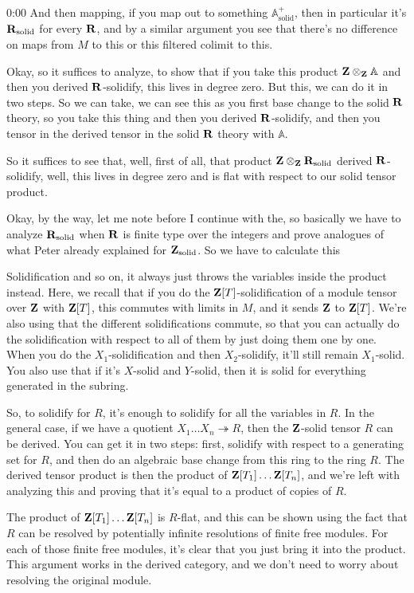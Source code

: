 \begin{unfinished}{0:00}
And then mapping, if you map out to something $\mathbb{A}^+_{\mathrm{solid}}$, then in particular it's $\mathbf R_{\mathrm{solid}}$ for every $\mathbf R$, and by a similar argument you see that there's no difference on maps from $M$ to this or this filtered colimit to this. 

Okay, so it suffices to analyze, to show that if you take this product $\mathbf Z \otimes_\mathbf Z \mathbb{A}$ and then you derived $\mathbf R$-solidify, this lives in degree zero. But this, we can do it in two steps. So we can take, we can see this as you first base change to the solid $\mathbf R$ theory, so you take this thing and then you derived $\mathbf R$-solidify, and then you tensor in the derived tensor in the solid $\mathbf R$ theory with $\mathbb{A}$.

So it suffices to see that, well, first of all, that product $\mathbf Z \otimes_\mathbf Z \mathbf R_{\mathrm{solid}}$ derived $\mathbf R$-solidify, well, this lives in degree zero and is flat with respect to our solid tensor product.

Okay, by the way, let me note before I continue with the, so basically we have to analyze $\mathbf R_{\mathrm{solid}}$ when $\mathbf R$ is finite type over the integers and prove analogues of what Peter already explained for $\mathbf Z_{\mathrm{solid}}$. So we have to calculate this

Solidification and so on, it always just throws the variables inside the product instead. Here, we recall that if you do the $\mathbf Z[T]$-solidification of a module tensor over $\mathbf Z$ with $\mathbf Z[T]$, this commutes with limits in $M$, and it sends $\mathbf Z$ to $\mathbf Z[T]$. We're also using that the different solidifications commute, so that you can actually do the solidification with respect to all of them by just doing them one by one. When you do the $X_1$-solidification and then $X_2$-solidify, it'll still remain $X_1$-solid. You also use that if it's $X$-solid and $Y$-solid, then it is solid for everything generated in the subring.

So, to solidify for $R$, it's enough to solidify for all the variables in $R$. In the general case, if we have a quotient $X_1 \dots X_n \twoheadrightarrow R$, then the $\mathbf Z$-solid tensor $R$ can be derived. You can get it in two steps: first, solidify with respect to a generating set for $R$, and then do an algebraic base change from this ring to the ring $R$. The derived tensor product is then the product of $\mathbf Z[T_1] \dots \mathbf Z[T_n]$, and we're left with analyzing this and proving that it's equal to a product of copies of $R$.

The product of $\mathbf Z[T_1] \dots \mathbf Z[T_n]$ is $R$-flat, and this can be shown using the fact that $R$ can be resolved by potentially infinite resolutions of finite free modules. For each of those finite free modules, it's clear that you just bring it into the product. This argument works in the derived category, and we don't need to worry about resolving the original module.


\end{unfinished}
